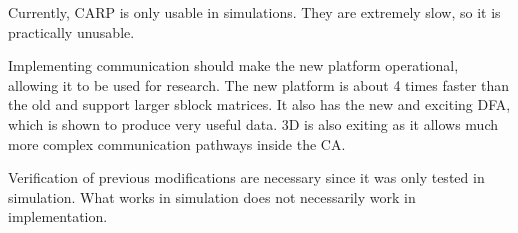 

Currently, CARP is only usable in simulations.
They are extremely slow, so it is practically unusable.

Implementing communication should make the new platform operational, allowing it to be used for research.
The new platform is about 4 times faster than the old and support larger sblock matrices.
It also has the new and exciting DFA, which is shown to produce very useful data.
3D is also exiting as it allows much more complex communication pathways inside the CA.

Verification of previous modifications are necessary since it was only tested in simulation.
What works in simulation does not necessarily work in implementation.

